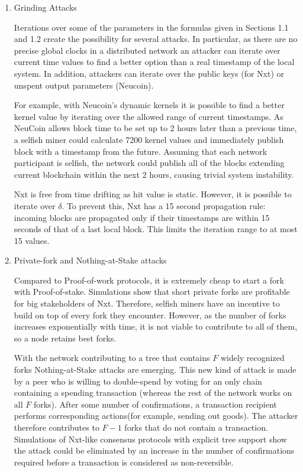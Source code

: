 \documentclass[preprint,review,3p,times,twocolumn]{elsarticle}
\begin{document}
\begin{enumerate}[1.]
\item Grinding Attacks

Iterations over some of the parameters in the formulas given in Sections 1.1 and 1.2 create the possibility for several attacks. In particular, as there are no precise global clocks in a distributed network an attacker can iterate over current time values to find a better option than a real timestamp of the local system. In addition, attackers can iterate over the public keys (for Nxt) or unspent output parameters (Neucoin). 

For example, with Neucoin's dynamic kernels it is possible to find a better kernel value by iterating over the allowed range of current timestamps. As NeuCoin allows block time to be set up to 2 hours later than a previous time, a selfish miner could calculate 7200 kernel values and immediately publish block with a timestamp from the future. Assuming that each network participant is selfish, the network could publish all of the blocks extending current blockchain within the next 2 hours, causing trivial system instability. 

Nxt is free from time drifting as hit value is static. However, it is possible to iterate over \(\delta\). To prevent this, Nxt has a 15 second propagation rule: incoming blocks are propagated only if their timestamps are within 15 seconds of that of a last local block. This limits the iteration range to at most 15 values.

\item Private-fork and Nothing-at-Stake attacks

Compared to Proof-of-work protocols, it is extremely cheap to start a fork with Proof-of-stake. Simulations show that short private forks are profitable for big stakeholders of Nxt\cite{Andruiman2014}. Therefore, selfish miners have an incentive to build on top of every fork they encounter. However, as the number of forks increases exponentially with time, it is not viable to contribute to all of them, so a node retains best forks. 

With the network contributing to a tree that contains \(F\) widely recognized forks Nothing-at-Stake attacks are emerging. This new kind of attack is made by a peer who is willing to double-spend by voting for an only chain containing a spending transaction (whereas the rest of the network works on all \(F\) forks). After some number of confirmations, a transaction recipient performs corresponding actions(for example, sending out goods). The attacker therefore contributes to \(F-1\) forks that do not contain a transaction. Simulations of Nxt-like consensus protocols with explicit tree support show the attack could be eliminated by an increase in the number of confirmations required before a transaction is considered as non-reversible\cite{Andruiman2015}.


\end{enumerate}
\end{document}
